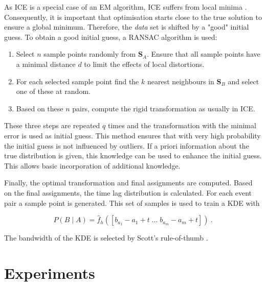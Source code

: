 \documentclass[conference]{IEEEtran}
\theoremstyle{examplestyle}
\begin{document}
As \ac{ICE} is a special case of an \ac{EM} algorithm, \ac{ICE} suffers from local minima \cite{Do2008}. Consequently, it is important that optimisation starts close to the true solution to ensure a global minimum. Therefore, the \textit{data} set is shifted by a "good" initial guess. To obtain a good initial guess, a \ac{RANSAC} \cite{Fischler1981} algorithm is used:

\begin{enumerate}
	\item Select \(n\) sample points randomly from \(\pmb{S}_A\). Ensure that all sample points have a minimal distance \(d\) to limit the effects of local distortions.
	\item For each selected sample point find the \(k\) nearest neighbours in \(\pmb{S}_B\) and select one of these at random.
	\item Based on these \(n\) pairs, compute the rigid transformation as usually in \ac{ICE}.
\end{enumerate}

These three steps are repeated \(q\) times and the transformation with the minimal error is used as initial guess. This method ensures that with very high probability the initial guess is not influenced by outliers. If a priori information about the true distribution is given, this knowledge can be used to enhance the initial guess. This allows basic incorporation of additional knowledge.

Finally, the optimal transformation and final assignments are computed. Based on the final assignments, the time lag distribution is calculated. For each event pair a sample point is generated. This set of samples is used to train a \ac{KDE} with

\begin{equation}
	\label{eq:solutionICP}
	P(B \; | \; A) = \hat{f}_h \left(
		\left[
			b_{a_1} - a_1 + t \;
			\dots \;
			b_{a_m} - a_m + t
		\right] \right)~.
\end{equation}

The bandwidth of the \ac{KDE} is selected by Scott's rule-of-thumb \cite{Scott1992}.












\section{Experiments}
\end{document}
